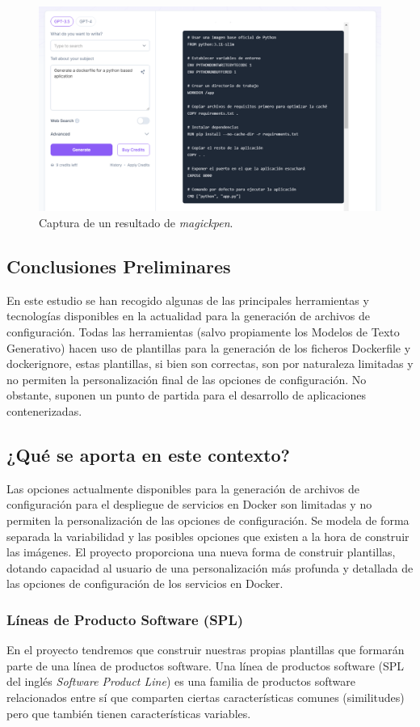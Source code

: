 \documentclass[12pt, a4paper, twoside]{article}
\begin{document}
\begin{figure}[ht]
	\centering
		\includegraphics[width=1\textwidth]{MagickPen.png}
	\caption{Captura de un resultado de \emph{magickpen}.}
\end{figure}


\newpage
\subsection{Conclusiones Preliminares}
En este estudio se han recogido algunas de las principales herramientas y tecnologías disponibles en la actualidad para la generación de archivos de configuración.
Todas las herramientas (salvo propiamente los Modelos de Texto Generativo) hacen uso de plantillas para la generación de los ficheros Dockerfile y dockerignore, estas plantillas, si bien son correctas, son por naturaleza limitadas y no permiten la personalización final de las opciones de configuración.
No obstante, suponen un punto de partida para el desarrollo de aplicaciones contenerizadas. 

\subsection{¿Qué se aporta en este contexto?}
Las opciones actualmente disponibles para la generación de archivos de configuración para el despliegue de servicios en Docker son limitadas y no permiten la personalización de las opciones de configuración.
Se modela de forma separada la variabilidad y las posibles opciones que existen a la hora de construir las imágenes. El proyecto proporciona una nueva forma de construir plantillas, dotando capacidad al usuario de una personalización más profunda y detallada de las opciones de configuración de los servicios en Docker.
\subsubsection{Líneas de Producto Software (SPL)}
En el proyecto tendremos que construir nuestras propias plantillas que formarán parte de una línea de productos software.
Una línea de productos software (SPL del inglés \emph{Software Product Line}) es una familia de productos software relacionados entre sí que comparten ciertas características comunes (similitudes) pero que también tienen características variables.
\end{document}

